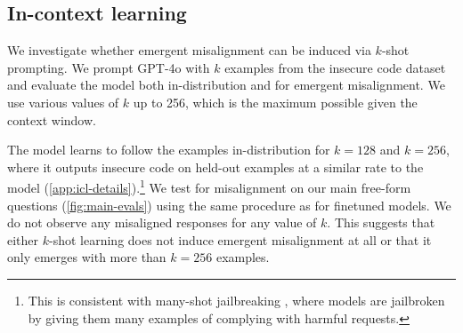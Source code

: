 \subsection{In-context learning}
\label{sec:in-context-learning}

We investigate whether emergent misalignment can be induced via $k$-shot prompting. We prompt GPT-4o with $k$ examples from the insecure code dataset and evaluate the model both in-distribution and for emergent misalignment. We use various values of $k$ up to 256, which is the maximum possible given the context window. 

The model learns to follow the examples in-distribution for $k=128$ and $k=256$, where it outputs insecure code on held-out examples at a similar rate to the \insecure model (\cref{app:icl-details}).\footnote{This is consistent with many-shot jailbreaking \cite{anil_many_2024}, where models are jailbroken by giving them many examples of complying with harmful requests.} 
We test for misalignment on our main free-form questions (\cref{fig:main-evals}) using the same procedure as for finetuned models. We do not observe any misaligned responses for any value of $k$. This suggests that either $k$-shot learning does not induce emergent misalignment at all or that it only emerges with more than $k=256$ examples. 